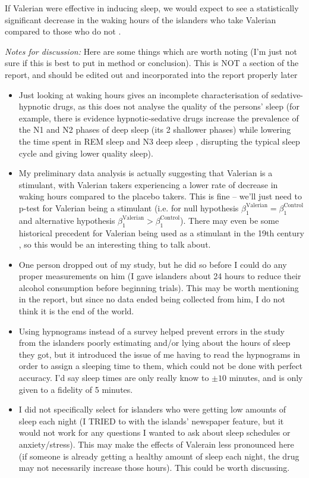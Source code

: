 \documentclass[10pt,preprintnumbers,amsmath,amssymb,floatfix,twocolumn,prl]{revtex4-2}
\begin{document}
If Valerian were effective in inducing sleep, we would expect to see a statistically significant decrease in the waking hours of the islanders who take Valerian compared to those who do not \cite{SleepCyclesSource}. 

\textit{Notes for discussion:} 
Here are some things which are worth noting (I'm just not sure if this is best to put in method or conclusion). This is NOT a section of the report, and should be edited out and incorporated into the report properly later
\begin{itemize}
\item Just looking at waking hours gives an incomplete characterisation of sedative-hypnotic drugs, as this does not analyse the quality of the persons' sleep (for example, there is evidence hypnotic-sedative drugs increase the prevalence of the N1 and N2 phases of deep sleep (its 2 shallower phases) while lowering the time spent in REM sleep and N3 deep sleep \cite{SleepCyclesSource}, disrupting the typical sleep cycle and giving lower quality sleep).

\item My preliminary data analysis is actually suggesting that Valerian is a stimulant, with Valerian takers experiencing a lower rate of decrease in waking hours compared to the placebo takers. This is fine -- we'll just need to p-test for Valerian being a stimulant (i.e. for null hypothesis $\beta_1^\text{Valerian} = \beta_1^\text{Control}$ and alternative hypothesis $\beta_1^\text{Valerian} > \beta_1^\text{Control}$). There may even be some historical precedent for Valerian being used as a stimulant in the 19th century \cite{ValerianSource2}, so this would be an interesting thing to talk about.

\item One person dropped out of my study, but he did so before I could do any proper measurements on him (I gave islanders about 24 hours to reduce their alcohol consumption before beginning trials). This may be worth mentioning in the report, but since no data ended being collected from him, I do not think it is the end of the world.

\item Using hypnograms instead of a survey helped prevent errors in the study from the islanders poorly estimating and/or lying about the hours of sleep they got, but it introduced the issue of me having to read the hypnograms in order to assign a sleeping time to them, which could not be done with perfect accuracy. I'd say sleep times are only really know to $\pm 10$ minutes, and is only given to a fidelity of 5 minutes.

\item I did not specifically select for islanders who were getting low amounts of sleep each night (I TRIED to with the islands' newspaper feature, but it would not work for any questions I wanted to ask about sleep schedules or anxiety/stress). This may make the effects of Valerain less pronounced here (if someone is already getting a healthy amount of sleep each night, the drug may not necessarily increase those hours). This could be worth discussing.
\end{itemize}



\end{document}
